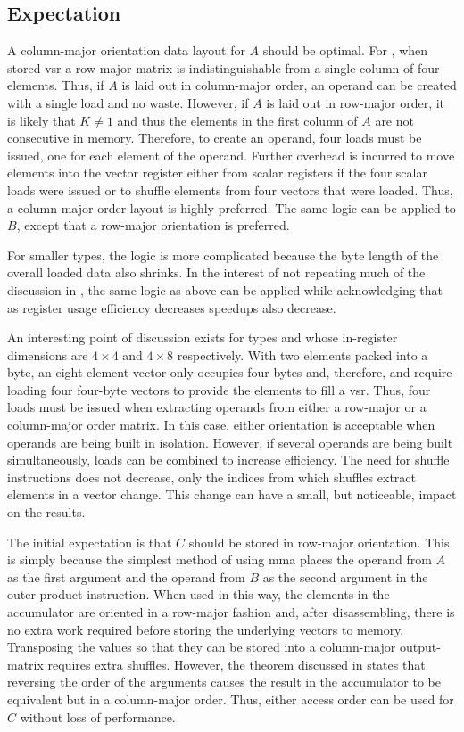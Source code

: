 \documentclass[\main/thesis.tex]{subfiles}
\begin{document}
\subsection{Expectation}
\label{sec:orderExpectation}
A column-major orientation data layout for $A$ should be optimal.
For , when stored \gls{vsr} a row-major matrix is indistinguishable from a single column of four elements.
Thus, if $A$ is laid out in column-major order, an operand can be created with a single load and no waste.
However, if $A$ is laid out in row-major order, it is likely that $K \ne 1$ and thus the elements in the first column of $A$ are not consecutive in memory.
Therefore, to create an operand, four loads must be issued, one for each element of the operand.
Further overhead is incurred to move elements into the vector register either from scalar registers if the four scalar loads were issued or to shuffle elements from four vectors that were loaded.
Thus, a column-major order layout is highly preferred.
The same logic can be applied to $B$, except that a row-major orientation is preferred.

For smaller types, the logic is more complicated because the byte length of the overall loaded data also shrinks.
In the interest of not repeating much of the discussion in , the same logic as above can be applied while acknowledging that as register usage efficiency decreases speedups also decrease.

An interesting point of discussion exists for types  and  whose in-register dimensions are $4 \times 4$ and $4 \times 8$ respectively.
With two  elements packed into a byte, an eight-element vector only occupies four bytes and, therefore,  and  require loading four four-byte vectors to provide the elements to fill a \gls{vsr}.
Thus, four loads must be issued when extracting operands from either  a row-major or a column-major order matrix.
In this case, either orientation is acceptable when operands are being built in isolation.
However, if several operands are being built simultaneously, loads can be combined to increase efficiency.
The need for shuffle instructions does not decrease, only the indices from which shuffles extract elements in a vector change.
This change can have a small, but noticeable, impact on the results.

The initial expectation is that $C$ should be stored in row-major orientation.
This is simply because the simplest method of using \gls{mma} places the operand from $A$ as the first argument and the operand from $B$ as the second argument in the outer product instruction.
When used in this way, the elements in the accumulator are oriented in a row-major fashion and, after disassembling, there is no extra work required before storing the underlying vectors to memory.
Transposing the values so that they can be stored into a column-major output-matrix requires extra shuffles.
However, the theorem discussed in  states that reversing the order of the arguments causes the result in the accumulator to be equivalent but in a column-major order.
Thus, either access order can be used for $C$ without loss of performance.
\end{document}
